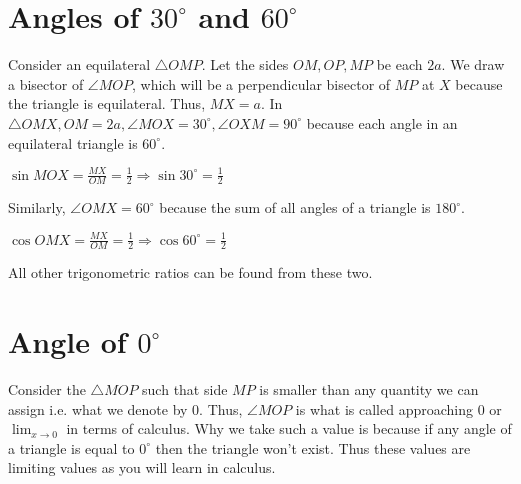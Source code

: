 \section{Angles of $30^\circ$ and $60^\circ$}
\begin{center}
\end{center}
Consider an equilateral $\triangle OMP$. Let the sides $OM, OP, MP$ be each $2a$. We draw a bisector of $\angle MOP$, which will be
a perpendicular bisector of $MP$ at $X$ because the triangle is equilateral. Thus, $MX = a$. In $\triangle OMX, OM=2a, \angle
MOX=30^\circ, \angle OXM=90^\circ$ because each angle in an equilateral triangle is $60^\circ$.

$\sin MOX=\frac{MX}{OM} = \frac{1}{2}\Rightarrow \sin30^\circ = \frac{1}{2}$

Similarly, $\angle OMX=60^\circ$ because the sum of all angles of a triangle is $180^\circ$.

$\cos OMX = \frac{MX}{OM} = \frac{1}{2}\Rightarrow \cos60^\circ = \frac{1}{2}$

All other trigonometric ratios can be found from these two.

\section{Angle of $0^\circ$}
\begin{center}
\end{center}


Consider the $\triangle MOP$ such that side $MP$ is smaller than any quantity we can assign i.e. what we denote by $0$. Thus,
$\angle MOP$ is what is called approaching $0$ or $\lim_{x\to 0}$ in terms of calculus. Why we take such a value is because if any
angle of a triangle is equal to $0^\circ$ then the triangle won't exist. Thus these values are limiting values as you will learn in
calculus.

